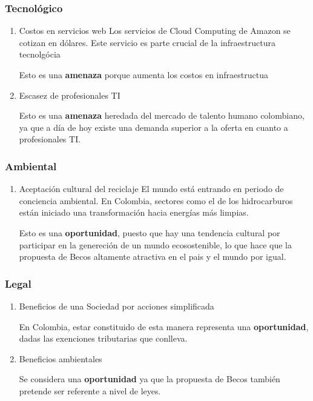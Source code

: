 \documentclass[11pt]{article}
\begin{document}
\subsubsection{Tecnológico}
\label{sec:org20fde08}
\begin{enumerate}
\item Costos en servicios web
\label{sec:org049bc4a}
Los servicios de Cloud Computing de Amazon se cotizan en dólares.
Este servicio es parte crucial de la infraestructura tecnolgócia

Esto es una \textbf{amenaza} porque aumenta los costos en infraestructua
\item Escasez de profesionales TI
\label{sec:org0ee58e0}

Esto es una \textbf{amenaza} heredada del mercado de talento humano
colombiano, ya que a día de hoy existe una demanda superior a la
oferta en cuanto a profesionales TI.
\end{enumerate}

\subsubsection{Ambiental}
\label{sec:orge550e3f}
\begin{enumerate}
\item Aceptación cultural del reciclaje
\label{sec:org3ae5347}
El mundo está entrando en periodo de conciencia ambiental. En
Colombia, sectores como el de los hidrocarburos están iniciado una
transformación hacia energías más limpias.

Esto es una \textbf{oportunidad}, puesto que hay una tendencia cultural
por participar en la genereción de un mundo ecosostenible, lo
que hace que la propuesta de Becos altamente atractiva en el pais
y el mundo por igual.
\end{enumerate}
\subsubsection{Legal}
\label{sec:orgb9b1272}
\begin{enumerate}
\item Beneficios de una Sociedad por acciones simplificada
\label{sec:org1303f7f}

En Colombia, estar constituido de esta manera representa una
\textbf{oportunidad}, dadas las exenciones tributarias que conlleva.

\item Beneficios ambientales
\label{sec:org39768c3}

Se considera una \textbf{oportunidad} ya que la propuesta de Becos también
pretende ser referente a nivel de leyes.
\end{enumerate}
\end{document}
